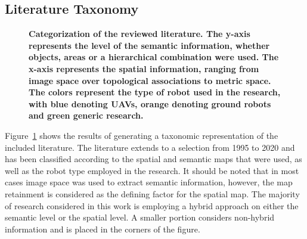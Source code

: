\documentclass[twocolumn,letterpaper]{IEEEAerospaceCLS}  %
\begin{document}
\subsection{Literature Taxonomy} \label{ssec:ResLit}
\begin{figure}
    \centering
    \caption{\bf{
        Categorization of the reviewed literature. The y-axis represents the level of the semantic information, whether objects, areas or a hierarchical combination were used. The x-axis represents the spatial information, ranging from image space over topological associations to metric space. The colors represent the type of robot used in the research, with blue denoting UAVs, orange denoting ground robots and green generic research.
    }}
    \label{fig:LitRes}
\end{figure}
Figure~\ref{fig:LitRes} shows the results of generating a taxonomic representation of the included literature. The literature extends to a selection from 1995 to 2020 and has been classified according to the spatial and semantic maps that were used, as well as the robot type employed in the research. It should be noted that in most cases image space was used to extract semantic information, however, the map retainment is considered as the defining factor for the spatial map. The majority  of research considered in this work is employing a hybrid approach on either the semantic level or the spatial level. A smaller portion considers non-hybrid information and is placed in the corners of the figure.  
\end{document}
